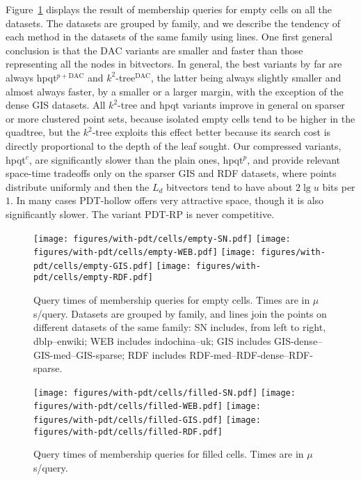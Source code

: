\documentclass{elsarticle}
\newcommand{\DAC}{\ensuremath{\mathrm{DAC}}}
\newcommand{\kt}{$k^2$-tree\xspace}
\newcommand{\ktdac}{$k^2$-tree$^{\DAC}$\xspace}
\newcommand{\dblp}{\textsf{dblp}\xspace}
\newcommand{\enwiki}{\textsf{enwiki}\xspace}
\newcommand{\indo}{\textsf{indochina}\xspace}
\newcommand{\uk}{\textsf{uk}\xspace}
\newcommand{\giss}{\textsf{GIS-sparse}\xspace}
\newcommand{\gism}{\textsf{GIS-med}\xspace}
\newcommand{\gisd}{\textsf{GIS-dense}\xspace}
\newcommand{\rdfs}{\textsf{RDF-sparse}\xspace}
\newcommand{\rdfm}{\textsf{RDF-med}\xspace}
\newcommand{\rdfd}{\textsf{RDF-dense}\xspace}
\newcommand{\hpqt}{\textsf{hpqt}\xspace}
\newcommand{\hpqtp}{\textsf{hpqt$^p$}\xspace}
\newcommand{\hpqtR}{\textsf{hpqt$^{c}$}\xspace}
\newcommand{\hpqtpdac}{\textsf{hpqt$^{p+\DAC}$}\xspace}
\newcommand{\pdth}{PDT-hollow\xspace}
\newcommand{\pdtrp}{PDT-RP\xspace}
\begin{document}
Figure~\ref{fig:timesempty} displays the result of membership queries for empty cells on all the datasets. The datasets are grouped by family, and we describe the tendency of each method in the datasets of the same family using lines. One first general conclusion is that the $\DAC$ variants are smaller and faster than those representing all the nodes in bitvectors. In general, the best variants by far are always \hpqtpdac and \ktdac, the latter being always slightly smaller and almost always faster, by a smaller or a larger margin, with the exception of the dense GIS datasets. All \kt and \hpqt variants improve in general on sparser or more clustered point sets,  because isolated empty cells tend to be higher in the quadtree, but the \kt exploits this effect better because its search cost is directly proportional to the depth of the leaf sought. Our compressed variants, \hpqtR, are significantly slower than the plain ones, \hpqtp, and provide relevant space-time tradeoffs only on the sparser GIS and RDF datasets, where points distribute uniformly and then the $L_d$ bitvectors tend to have about $2\lg u$ bits per $1$. In many cases \pdth offers very attractive space, though it is also significantly slower. The variant \pdtrp is never competitive.



\begin{figure}[t]
\begin{center}
\texttt{[image: figures/with-pdt/cells/empty-SN.pdf]}
\texttt{[image: figures/with-pdt/cells/empty-WEB.pdf]}
\texttt{[image: figures/with-pdt/cells/empty-GIS.pdf]}
\texttt{[image: figures/with-pdt/cells/empty-RDF.pdf]}
\end{center}
\caption{Query times of membership queries for empty cells. Times are in $\mu$s/query. Datasets are grouped by family, and lines join the points on different datasets of the same family: SN includes, from left to right, \dblp--\enwiki; WEB includes \indo--\uk; GIS includes \gisd--\gism--\giss; RDF includes \rdfm--\rdfd--\rdfs.}
\label{fig:timesempty}
\end{figure}

\begin{figure}[t]
\begin{center}
\texttt{[image: figures/with-pdt/cells/filled-SN.pdf]}
\texttt{[image: figures/with-pdt/cells/filled-WEB.pdf]}
\texttt{[image: figures/with-pdt/cells/filled-GIS.pdf]}
\texttt{[image: figures/with-pdt/cells/filled-RDF.pdf]}
\end{center}
\caption{Query times of membership queries for filled cells. Times are in $\mu$s/query.}
\label{fig:timesfilled}
\end{figure}
\end{document}
